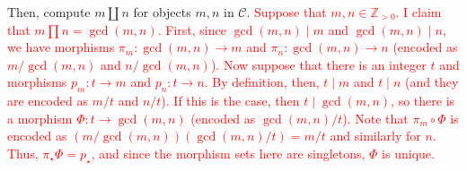 \documentclass[12pt]{article}
\newcommand{\bbZ}{\mathbb{Z}}
\newcommand{\calC}{\mathcal{C}}
\newcommand{\solution}[1]{\textcolor{red}{#1}}
\begin{document}

Then, compute $m\coprod n$ for objects $m,n$ in $\calC$. 
\solution{Suppose that $m,n\in \bbZ_{>0}$. I claim that $m\prod n =
  \gcd(m,n).$ First, since $\gcd(m,n)\mid m$ and $\gcd(m,n)\mid n$, we
  have morphisms $\pi_m: \gcd(m,n) \rightarrow m$ and $\pi_n:
  \gcd(m,n)\rightarrow n$ (encoded as $m/\gcd(m,n)$ and $n/\gcd(m,n)$). Now suppose that there is an integer $t$
  and morphisms $p_m: t\rightarrow m$ and $p_n: t\rightarrow n$. By
  definition, then, $t\mid m$ and $t\mid n$  (and they are encoded as $m/t$ and $n/t$). If this is the case, then
  $t\mid \gcd(m,n)$, so there is a morphism $\Phi: t\rightarrow
  \gcd(m,n)$ (encoded as $\gcd(m,n)/t$). Note that $\pi_m \circ \Phi$
  is encoded as $(m/\gcd(m,n))(\gcd(m,n)/t)=m/t$ and similarly for
  $n$. Thus, $\pi_\star \Phi= p_\star$, and since the morphism sets
  here are singletons, $\Phi$ is unique.}
\end{document}
